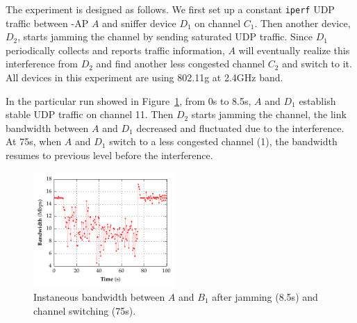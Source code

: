 The experiment is designed as follows. We first set up a constant \texttt{iperf}
UDP traffic between \PS{}-AP $A$ and sniffer device $D_1$ on channel
$C_1$. Then another device, $D_2$, starts jamming the channel by sending
saturated UDP traffic. Since $D_1$ periodically collects and reports traffic
information, $A$ will eventually realize this interference from $D_2$ and find
another less congested channel $C_2$ and switch to it. All devices in this
experiment are using 802.11g at 2.4GHz band. 

In the particular run showed in Figure~\ref{fig:bw}, from 0s to 8.5s, $A$ and
$D_1$ establish stable UDP traffic on channel 11. Then $D_2$ starts jamming the
channel, the link bandwidth between $A$ and $D_1$ decreased and fluctuated due
to the interference. At 75s, when $A$ and $D_1$ switch to a less congested
channel (1), the bandwidth resumes to previous level before the interference.

\begin{figure}[t!]
  \centering
  \includegraphics[width=0.48\textwidth]{./figures/ChannelBWGraph.pdf}
  \caption{Instaneous bandwidth between $A$ and $B_1$ after jamming (8.5s) and
  channel switching (75s).}
  \label{fig:bw}
\end{figure}
